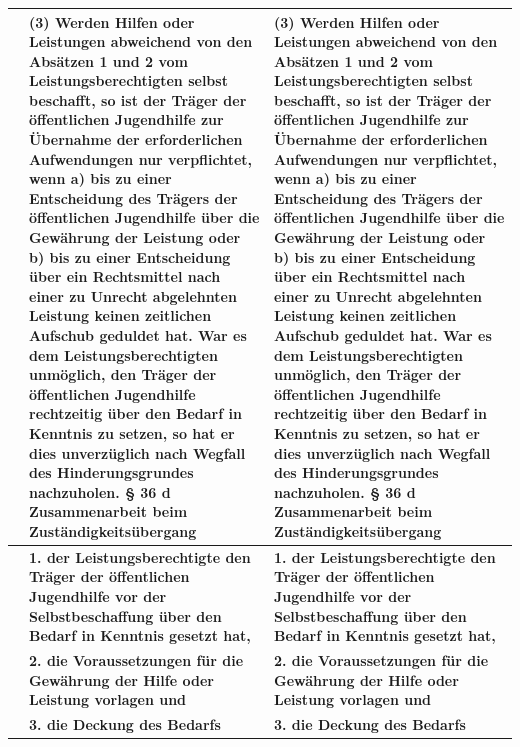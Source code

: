 \documentclass[10pt,a4paper,landscape]{article}
\begin{document}
\begin{longtable}{|L{8.6cm}|L{8.6cm}|L{8.6cm}|}
 & \textbf{(3) Werden Hilfen oder Leistungen abweichend von den Absätzen 1 und 2 vom Leistungsberechtigten selbst beschafft, so ist der Träger der öffentlichen Jugendhilfe zur Übernahme der erforderlichen Aufwendungen nur verpflichtet, wenn } \newline \textbf{a) bis zu einer Entscheidung des Trägers der öffentlichen Jugendhilfe über die Gewährung der Leistung oder } \newline \textbf{b) bis zu einer Entscheidung über ein Rechtsmittel nach einer zu Unrecht abgelehnten Leistung keinen zeitlichen Aufschub geduldet hat. War es dem Leistungsberechtigten unmöglich, den Träger der öffentlichen Jugendhilfe rechtzeitig über den Bedarf in Kenntnis zu setzen, so hat er dies unverzüglich nach Wegfall des Hinderungsgrundes nachzuholen. }\textbf{\S{} 36 d }\textbf{Zusammenarbeit beim Zuständigkeitsübergang } & \textbf{(3) Werden Hilfen oder Leistungen abweichend von den Absätzen 1 und 2 vom Leistungsberechtigten selbst beschafft, so ist der Träger der öffentlichen Jugendhilfe zur Übernahme der erforderlichen Aufwendungen nur verpflichtet, wenn } \newline \textbf{a) bis zu einer Entscheidung des Trägers der öffentlichen Jugendhilfe über die Gewährung der Leistung oder } \newline \textbf{b) bis zu einer Entscheidung über ein Rechtsmittel nach einer zu Unrecht abgelehnten Leistung keinen zeitlichen Aufschub geduldet hat. War es dem Leistungsberechtigten unmöglich, den Träger der öffentlichen Jugendhilfe rechtzeitig über den Bedarf in Kenntnis }\textbf{zu setzen, so hat er dies unverzüglich nach Wegfall des Hinderungsgrundes nachzuholen. }\textbf{\S{} 36 d }\textbf{Zusammenarbeit beim Zuständigkeitsübergang } \\
\hline
 & \textbf{1. der Leistungsberechtigte den Träger der öffentlichen Jugendhilfe vor der Selbstbeschaffung über den Bedarf in Kenntnis gesetzt hat, } & \textbf{1. der Leistungsberechtigte den Träger der öffentlichen Jugendhilfe vor der Selbstbeschaffung über den Bedarf in Kenntnis gesetzt hat, } \\
\hline
 & \textbf{2. die Voraussetzungen für die Gewährung der Hilfe oder Leistung vorlagen und } & \textbf{2. die Voraussetzungen für die Gewährung der Hilfe oder Leistung vorlagen und } \\
\hline
 & \textbf{3. die Deckung des Bedarfs } & \textbf{3. die Deckung des Bedarfs } \\
\hline

\end{longtable}
\end{document}
